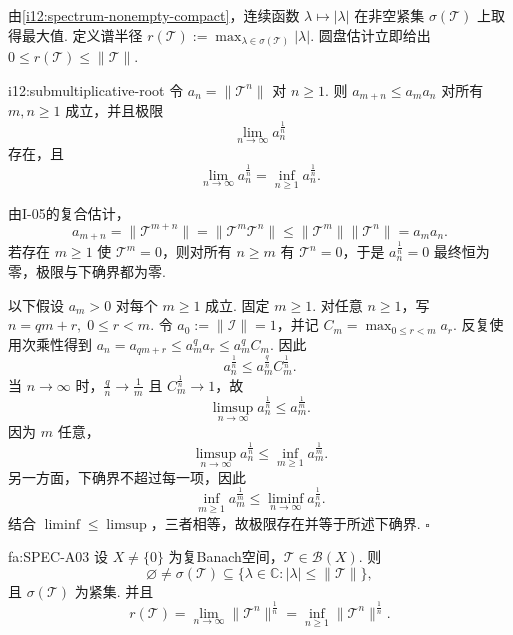由\autoref{i12:spectrum-nonempty-compact}，连续函数 \(\displaystyle \lambda\mapsto|\lambda|\) 在非空紧集 \(\displaystyle \sigma(\mathcal T)\) 上取得最大值. 定义谱半径
\(\displaystyle r(\mathcal T) := \max_{\lambda\in\sigma(\mathcal T)}|\lambda|\).
圆盘估计立即给出
\(\displaystyle 0 \leqslant r(\mathcal T) \leqslant \|\mathcal T\|\).

\begin{FALemma}[B][次乘序列的根极限]{i12:submultiplicative-root}
令 \(\displaystyle a_n=\|\mathcal T^n\|\) 对 \(\displaystyle n\geqslant1\). 则
\(\displaystyle a_{m+n} \leqslant a_ma_n\)
对所有 \(\displaystyle m,n\geqslant1\) 成立，并且极限
\[
\lim_{n\to\infty}a_n^{\frac{1}{n}}
\]
存在，且
\[
\lim_{n\to\infty}a_n^{\frac{1}{n}}
=
\inf_{n\geqslant1}a_n^{\frac{1}{n}}.
\]
\end{FALemma}

\begin{FAProof}
由I-05的复合估计，
\[
a_{m+n}
=
\|\mathcal T^{m+n}\|
=
\|\mathcal T^m\mathcal T^n\|
\leqslant
\|\mathcal T^m\|\|\mathcal T^n\|
=
a_ma_n.
\]
若存在 \(\displaystyle m\geqslant1\) 使 \(\displaystyle \mathcal T^m=0\)，则对所有 \(\displaystyle n\geqslant m\) 有 \(\displaystyle \mathcal T^n=0\)，于是 \(\displaystyle a_n^{\frac{1}{n}}=0\) 最终恒为零，极限与下确界都为零.

以下假设 \(\displaystyle a_m>0\) 对每个 \(\displaystyle m\geqslant1\) 成立. 固定 \(\displaystyle m\geqslant1\). 对任意 \(\displaystyle n\geqslant1\)，写
\(\displaystyle n=qm+r, \; 0\leqslant r<m\).
令 \(\displaystyle a_0:=\|\mathcal I\|=1\)，并记 \(\displaystyle C_m=\max_{0\leqslant r<m}a_r\). 反复使用次乘性得到
\(\displaystyle a_n =a_{qm+r} \leqslant a_m^q a_r \leqslant a_m^q C_m\).
因此
\[
a_n^{\frac{1}{n}}
\leqslant
a_m^{\frac{q}{n}}C_m^{\frac{1}{n}}.
\]
当 \(\displaystyle n\to\infty\) 时，\(\displaystyle \frac{q}{n}\to\frac{1}{m}\) 且 \(\displaystyle C_m^{\frac{1}{n}}\to1\)，故
\[
\limsup_{n\to\infty}a_n^{\frac{1}{n}}
\leqslant
a_m^{\frac{1}{m}}.
\]
因为 \(\displaystyle m\) 任意，
\[
\limsup_{n\to\infty}a_n^{\frac{1}{n}}
\leqslant
\inf_{m\geqslant1}a_m^{\frac{1}{m}}.
\]
另一方面，下确界不超过每一项，因此
\[
\inf_{m\geqslant1}a_m^{\frac{1}{m}}
\leqslant
\liminf_{n\to\infty}a_n^{\frac{1}{n}}.
\]
结合 \(\displaystyle \liminf\leqslant\limsup\)，三者相等，故极限存在并等于所述下确界.
\hfill\(\square\)
\end{FAProof}

\begin{FATheorem}[A][复Banach算子谱非空紧与谱半径公式]{fa:SPEC-A03}
设 \(\displaystyle X\neq\{0\}\) 为复Banach空间，\(\displaystyle \mathcal T\in\mathcal B(X)\). 则
\[
\varnothing
\neq
\sigma(\mathcal T)
\subseteq
\{\lambda\in\mathbb C:|\lambda|\leqslant\|\mathcal T\|\},
\]
且 \(\displaystyle \sigma(\mathcal T)\) 为紧集. 并且
\[
r(\mathcal T)
=
\lim_{n\to\infty}\|\mathcal T^n\|^{\frac{1}{n}}
=
\inf_{n\geqslant1}\|\mathcal T^n\|^{\frac{1}{n}}.
\]
\end{FATheorem}

